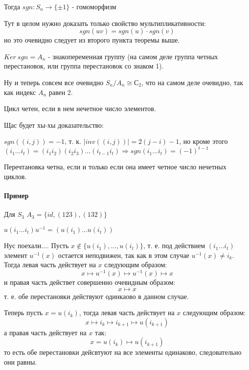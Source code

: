 \begin{Th}
Тогда $sgn: S_n \rightarrow \{\pm 1\}$ - гомоморфизм
\end{Th}
Тут в целом нужно доказать только свойство мультипликативности:
\[
	sgn\left(uv\right) = sgn\left(u\right)\cdot sgn\left(v\right)
\]
но это очевидно следует из второго пункта теоремы выше.

\begin{Def}
$Ker ~sgn = A_n$ - знакопеременная группу (на самом деле группа четных перестановок, или группа перестановок со знаком 1).
\end{Def}

Ну и теперь совсем все очевидно $S_n / A_n \cong С_2$, что на самом деле очевидно, так как индекс $A_n$ равен 2.

\begin{Th}
Цикл четен, если в нем нечетное число элементов.
\end{Th}

Щас будет хы-хы доказательство:
\begin{Proof}
$sgn\left(\left(i,j\right)\right) = -1$, т. к. $\left|inv\left(\left(i,j\right)\right)\right| = 2\left(j-i\right)-1$, но кроме этого $\left(i_1 ... i_t\right) = \left(i_1 i_2\right)\left(i_2 i_3\right) ... \left(i_{t-1} i_t\right) \Rightarrow sgn\left(i_1 ... i_t\right) = \left(-1\right)^{t-1}$
\end{Proof}

Перечтановка четна, если и только если она имеет четное число нечетных циклов.

\paragraph{Пример}
Для $S_3$ $A_3 = \{id, \left(1 2 3\right), \left(1 3 2\right)\}$

\begin{Th}
$u \left(i_1 ... i_t\right) u^{-1} = \left(u\left(i_1\right) ... u\left(i_t\right)\right)$
\end{Th}
\begin{Proof}
Нус поехали.... Пусть $x \not\in \{u\left(i_1\right), ... ,u\left(i_t\right)\}$, т. е. под действием $\left(i_1 ... i_t\right)$ элемент $u^{-1}\left(x\right)$ остается неподвижен, так как в этом случае $u^{-1}\left(x\right)\not= i_k$. Тогда левая часть действует на $x$ следующим образом:
\[
	x \mapsto u^{-1}\left(x\right) \mapsto u^{-1}\left(x\right) \mapsto x
\]
и правая часть действет совершенно очевидным образом:
\[
	x \mapsto x
\]
т. е. обе перестановки действуют одинкаово в данном случае.

Теперь пусть $x = u\left(i_k\right)$, тогда левая часть действует на $x$ следующим образом:
\[
	x \mapsto i_k \mapsto i_{k+1} \mapsto u\left(i_{k+1}\right)
\]
а правая часть действует на $x$ так:
\[
	x = u\left(i_k\right) \mapsto u\left(i_{k+1}\right)
\]
то есть обе перестановки дейсвтуют на все элементы одинаково, следовательно они равны.
\end{Proof}

